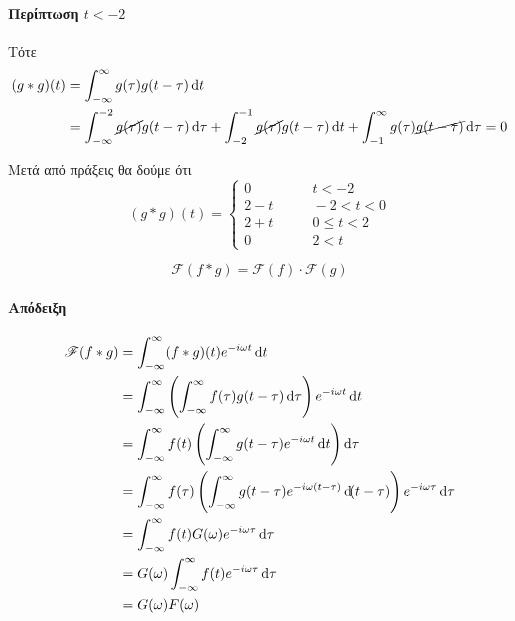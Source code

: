 \documentclass[11pt,a4paper,titlepage,final]{article}
\begin{document}
\paragraph{Περίπτωση \(t<-2\)} Τότε \begin{align*}
(g*g)(t) &= \int_{-\infty}^\infty g(\tau)g(t-\tau)\dif t
\\ &= \int_{-\infty}^{-2} \cancel{g(\tau)}g(t-\tau)\dif\tau
+ \int_{-2}^{-1} \cancel{g(\tau)}g(t-\tau)\dif t
+ \int_{-1}^\infty g(\tau)\cancel{g(t-\tau)}\dif\tau=0
\end{align*}

Μετά από πράξεις θα δούμε ότι
\[
(g*g)(t)=\begin{cases}
0 &\qquad t<-2\\
2-t &\qquad -2<t<0\\
2+t &\qquad 0\leq t < 2\\
0 &\qquad 2<t
\end{cases}
\]

\begin{center}
\end{center}

\begin{theorem*}{}
\[
\mathscr{F}(f*g)=
\mathscr{F}(f)
\cdot
\mathscr{F}(g)
\]
\end{theorem*}
\paragraph{Απόδειξη}
\begin{align*}
\mathscr{F}(f*g) &= \int_{-\infty}^\infty (f*g)(t)e^{-i\omega t}\dif t
\\
&=
\int_{-\infty}^\infty
\left(
\int_{-\infty}^\infty f(\tau)g(t-\tau)\dif \tau\right)e^{-i\omega t}\dif t
\\ &=
\int_{-\infty}^\infty f(t) \left( \int_{-\infty}^\infty
g(t-\tau)e^{-i\omega t}
\dif t \right)
\dif\tau
\\ &=
\int_{-\infty}^\infty f(\tau)
\left(
\int_{-\infty}^\infty g(t-\tau)e^{-i\omega(t-\tau)}\dif(t-\tau)
\right)
e^{-i\omega\tau}\dif\tau
\\ &=
\int_{-\infty}^\infty f(t) G(\omega) e^{-i\omega\tau}\dif\tau
\\ &=
G(\omega) \int_{-\infty}^\infty f(t) e^{-i\omega\tau}\dif \tau
\\ &= G(\omega)F(\omega)
\end{align*}
\end{document}
